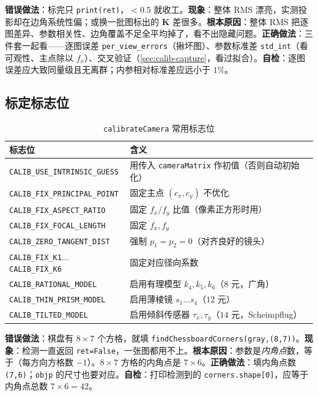 \begin{pitfall}
\textbf{错误做法}：标完只 \texttt{print(ret)}，$<0.5$ 就收工。\textbf{现象}：整体 RMS 漂亮，实测投影却在边角系统性偏；或换一批图标出的 $\mathbf{K}$ 差很多。\textbf{根本原因}：整体 RMS 把逐图差异、参数相关性、边角覆盖不足全平均掉了，看不出隐藏问题。\textbf{正确做法}：三件套一起看——逐图误差 \texttt{per\_view\_errors}（揪坏图）、参数标准差 \texttt{std\_int}（看可观性、主点除以 $f_x$）、交叉验证（\cref{sec:calib-capture}，看过拟合）。\textbf{自检}：逐图误差应大致同量级且无离群；内参相对标准差应远小于 $1\%$。
\end{pitfall}

\subsection{标定标志位}

\begin{table}[ht]\centering\small
\caption{\texttt{calibrateCamera} 常用标志位\cite{opencv2024calib}}
\label{tab:calib-flags}
\begin{tabular}{ll}
\toprule
标志位 & 含义 \\
\midrule
\texttt{CALIB\_USE\_INTRINSIC\_GUESS} & 用传入 \texttt{cameraMatrix} 作初值（否则自动初始化）\\
\texttt{CALIB\_FIX\_PRINCIPAL\_POINT} & 固定主点 $(c_x,c_y)$ 不优化 \\
\texttt{CALIB\_FIX\_ASPECT\_RATIO} & 固定 $f_x/f_y$ 比值（像素正方形时用）\\
\texttt{CALIB\_FIX\_FOCAL\_LENGTH} & 固定 $f_x,f_y$ \\
\texttt{CALIB\_ZERO\_TANGENT\_DIST} & 强制 $p_1=p_2=0$（对齐良好的镜头）\\
\texttt{CALIB\_FIX\_K1}$\ldots$\texttt{CALIB\_FIX\_K6} & 固定对应径向系数 \\
\texttt{CALIB\_RATIONAL\_MODEL} & 启用有理模型 $k_4,k_5,k_6$（$8$ 元，广角）\\
\texttt{CALIB\_THIN\_PRISM\_MODEL} & 启用薄棱镜 $s_1\ldots s_4$（$12$ 元）\\
\texttt{CALIB\_TILTED\_MODEL} & 启用倾斜传感器 $\tau_x,\tau_y$（$14$ 元，Scheimpflug）\\
\bottomrule
\end{tabular}
\end{table}

\begin{pitfall}
\textbf{错误做法}：棋盘有 $8\times7$ 个方格，就填 \texttt{findChessboardCorners(gray,(8,7))}。\textbf{现象}：检测一直返回 \texttt{ret=False}，一张图都用不上。\textbf{根本原因}：参数是\emph{内角点}数，等于（每方向方格数 $-1$）。$8\times7$ 方格的内角点是 $7\times6$。\textbf{正确做法}：填内角点数 \texttt{(7,6)}；\texttt{objp} 的尺寸也要对应。\textbf{自检}：打印检测到的 \texttt{corners.\allowbreak shape[0]}，应等于内角点总数 $7\times6=42$。
\end{pitfall}

